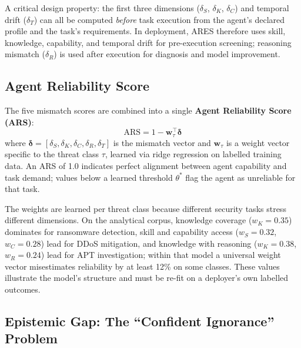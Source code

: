 \documentclass[journal,compsoc]{IEEEtran}
\newcommand{\ARES}{\textsc{ARES}}
\begin{document}
A critical design property: the first three dimensions ($\delta_S$,
$\delta_K$, $\delta_C$) and temporal drift ($\delta_T$) can all be computed
\textit{before} task execution from the agent's declared profile and the
task's requirements. In deployment, \ARES{} therefore uses skill,
knowledge, capability, and temporal drift for pre-execution
screening; reasoning mismatch ($\delta_R$) is used after execution
for diagnosis and model improvement.

\subsection{Agent Reliability Score}

The five mismatch scores are combined into a single
\textbf{Agent Reliability Score (ARS)}:
\[
  \mathrm{ARS} = 1 - \mathbf{w}_\tau^\top \boldsymbol{\delta}
\]
where $\boldsymbol{\delta} = [\delta_S, \delta_K, \delta_C, \delta_R,
\delta_T]$ is the mismatch vector and $\mathbf{w}_\tau$ is a weight vector
specific to the threat class $\tau$, learned via ridge regression on labelled
training data. An ARS of 1.0 indicates perfect alignment between agent
capability and task demand; values below a learned threshold $\theta^*$
flag the agent as unreliable for that task.

The weights are learned per threat class because different security tasks
stress different dimensions. On the analytical corpus, knowledge coverage
($w_K = 0.35$) dominates for ransomware detection, skill and capability
access ($w_S = 0.32$, $w_C = 0.28$) lead for DDoS mitigation, and knowledge
with reasoning ($w_K = 0.38$, $w_R = 0.24$) lead for APT investigation;
within that model a universal weight vector misestimates reliability by at
least 12\% on some classes. These values illustrate the model's structure
and must be re-fit on a deployer's own labelled outcomes.

\subsection{Epistemic Gap: The ``Confident Ignorance'' Problem}
\end{document}
